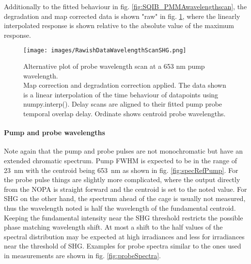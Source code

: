 \documentclass[twoside,openright,listof=numbered]{scrreprt}
\begin{document}


Additionally to the fitted behaviour in fig. \ref{fig:SQIB_PMMAwavelengthscan}, the degradation and map corrected data is shown "raw" in fig. \ref{fig:SQIB_PMMA_rawWavs}, where the linearly interpolated response is shown relative to the absolute value of the maximum response.
\begin{figure}[htp]
\centering
\texttt{[image: images/RawishDataWavelengthScanSHG.png]}
\caption[Probe wavelength scan at a 653 nm pump wavelength with linear interpolation of time steps.]{Alternative plot of probe wavelength scan at a 653 nm pump wavelength.\\Map correction and degradation correction applied. The data shown is a linear interpolation of the time behaviour of datapoints using numpy.interp(). Delay scans are aligned to their fitted pump probe temporal overlap delay. Ordinate shows centroid probe wavelengths.\label{fig:SQIB_PMMA_rawWavs}}
\end{figure}
\paragraph{Pump and probe wavelengths}
Note again that the pump and probe pulses are not monochromatic but have an extended chromatic spectrum. Pump FWHM is expected to be in the range of \SI{23}{\nano\meter} with the centroid being \SI{653}{\nano\meter} as shown in fig. \ref{fig:specRefPump}. For the probe pulse things are slightly more complicated, where the output directly from the NOPA is straight forward and the centroid is set to the noted value. For SHG on the other hand, the spectrum ahead of the cage is usually not measured, thus the wavelength noted is half the wavelength of the fundamental centroid. Keeping the fundamental intensity near the SHG threshold restricts the possible phase matching wavelength shift. At most a shift to the half values of the spectral distribution may be expected at high irradiances and less for irradiances near the threshold of SHG. Examples for probe spectra similar to the ones used in measurements are shown in fig. \ref{fig:probeSpectra}.
\end{document}
